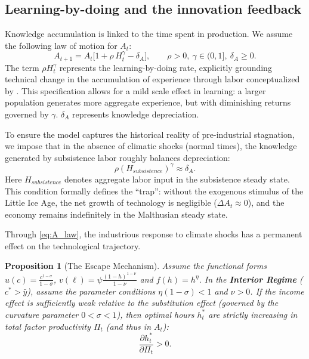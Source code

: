 \documentclass[11pt,a4paper]{article}
\newtheorem{prop}{Proposition}
\begin{document}
\subsection*{Learning-by-doing and the innovation feedback}

Knowledge accumulation is linked to the time spent in production. We assume the following law of motion for \(A_t\):
\begin{equation}
  A_{t+1} = A_t \big[1 + \rho\, H_t^\gamma - \delta_A \big],
  \qquad \rho>0,\ \gamma\in(0,1],\ \delta_A \ge 0.
  \label{eq:A_law}
\end{equation}
The term \(\rho H_t^\gamma\) represents the learning-by-doing rate, explicitly grounding technical change in the accumulation of experience through labor conceptualized by \textcite{Arrow1962}. This specification allows for a mild scale effect in learning: a larger population generates more aggregate experience, but with diminishing returns governed by \(\gamma\). \(\delta_A\) represents knowledge depreciation.

To ensure the model captures the historical reality of pre-industrial stagnation, we impose that in the absence of climatic shocks (normal times), the knowledge generated by subsistence labor roughly balances depreciation:
\begin{equation}
  \rho (H_{subsistence})^\gamma \approx \delta_A.
  \label{eq:stagnation_condition}
\end{equation}
Here \(H_{subsistence}\) denotes aggregate labor input in the subsistence steady state.
This condition formally defines the ``trap'': without the exogenous stimulus of the Little Ice Age, the net growth of technology is negligible (\(\Delta A_t \approx 0\)), and the economy remains indefinitely in the Malthusian steady state.

Through \eqref{eq:A_law}, the industrious response to climate shocks has a permanent effect on the technological trajectory.

\begin{prop}[The Escape Mechanism]
  \label{prop:escape}
  Assume the functional forms \(u(c) = \frac{c^{1-\sigma}}{1-\sigma}\), \(v(\ell) = \psi \frac{(1-h)^{1-\nu}}{1-\nu}\) and \(f(h)=h^\eta\). In the \textbf{Interior Regime} (\(c^* > \bar{y}\)), assume the parameter conditions \(\eta(1-\sigma) < 1\) and \(\nu > 0\). If the income effect is sufficiently weak relative to the substitution effect (governed by the curvature parameter \(0 < \sigma < 1\)), then optimal hours \(h_t^*\) are strictly increasing in total factor productivity \(\Pi_t\) (and thus in \(A_t\)):
  \[ \frac{\partial h_t^*}{\partial \Pi_t} > 0. \]
\end{prop}
\end{document}

